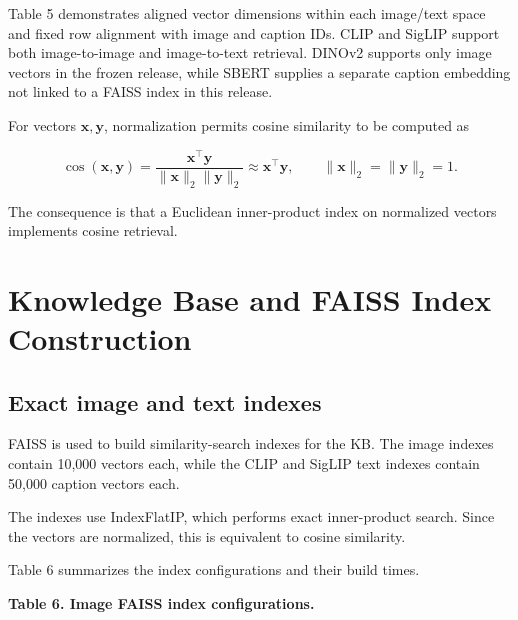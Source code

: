 \documentclass{article}
\begin{document}
Table 5 demonstrates aligned vector dimensions within each image/text
space and fixed row alignment with image and caption IDs. CLIP and
SigLIP support both image-to-image and image-to-text retrieval. DINOv2
supports only image vectors in the frozen release, while SBERT supplies
a separate caption embedding not linked to a FAISS index in this
release.

For vectors \(\mathbf x,\mathbf y\), normalization permits cosine
similarity to be computed as

\begin{equation*}
\cos(\mathbf{x},\mathbf{y})
=\frac{\mathbf{x}^{\top}\mathbf{y}}
       {\|\mathbf{x}\|_{2}\|\mathbf{y}\|_{2}}
\approx \mathbf{x}^{\top}\mathbf{y},
\qquad \|\mathbf{x}\|_{2}=\|\mathbf{y}\|_{2}=1.
\end{equation*}

The consequence is that a Euclidean inner-product index on normalized
vectors implements cosine retrieval.

\section{Knowledge Base and FAISS Index
Construction}\label{knowledge-base-and-faiss-index-construction}

\subsection{Exact image and text
indexes}\label{exact-image-and-text-indexes}

FAISS \cite{johnson_billion-scale_2021} is used to build similarity-search indexes for the KB.
The image indexes contain 10,000 vectors each, while the CLIP and
SigLIP text indexes contain 50,000 caption vectors each.

The indexes use IndexFlatIP, which performs exact inner-product
search. Since the vectors are normalized, this is equivalent to
cosine similarity. 

Table 6 summarizes the index configurations
and their build times.

\begin{center}
\textbf{Table 6. Image FAISS index configurations.}
\end{center}
\label{tab:indexes}

\begin{table}[htbp]
\centering
{}
\end{table}
\end{document}

